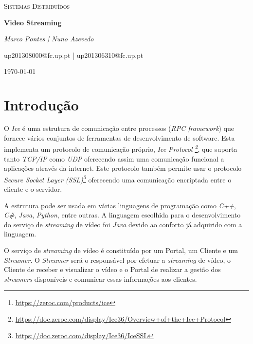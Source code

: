 \documentclass{article}
\begin{document}
\begin{titlepage}
	\centering
	\def\svgwidth{0.6\textwidth}
	\par
	\vspace{1cm}
	{\scshape\Large Sistemas Distribuídos\par}
	\vspace{3cm}
	{\Huge\bfseries Video Streaming\par}
	\vspace{5cm}
	{\Large\itshape Marco Pontes | Nuno Azevedo\par}
	\vspace{0.5cm}
	{\Large up201308000@fc.up.pt | up201306310@fc.up.pt\par}
	\vfill
	{\large \today}
\end{titlepage}

\newpage
\setcounter{page}{2}

\begin{abstract}
O objetivo deste projeto é a implementação de um serviço de \textit{streaming} de vídeo. A comunicação entre os vários 		elementos intervenientes assenta na tecnologia \textit{Ice}\footnote{\url{https://zeroc.com/products/ice}}.
\end{abstract}


\section{Introdução}

O \textit{Ice} é uma estrutura de comunicação entre processos (\textit{RPC framework}) que fornece vários conjuntos de ferramentas de desenvolvimento de software. Esta implementa um protocolo de comunicação próprio, \textit{Ice Protocol \footnote{\url{https://doc.zeroc.com/display/Ice36/Overview+of+the+Ice+Protocol}}}, que suporta tanto \textit{TCP/IP} como \textit{UDP} oferecendo assim uma comunicação funcional a aplicações através da internet. Este protocolo também permite usar o protocolo \textit{Secure Socket Layer (SSL)\footnote{\url{https://doc.zeroc.com/display/Ice36/IceSSL}}} oferecendo uma comunicação encriptada entre o cliente e o servidor. 

A estrutura pode ser usada em várias linguagens de programação como \textit{C++}, \textit{C\#}, \textit{Java}, \textit{Python}, entre outras. A linguagem escolhida para o desenvolvimento do serviço de \textit{streaming} de vídeo foi \textit{Java} devido ao conforto já adquirido com a linguagem.

O serviço de \textit{streaming} de vídeo é constituído por um Portal, um Cliente e um \textit{Streamer}. O \textit{Streamer} será o responsável por efetuar a \textit{streaming} de vídeo, o Cliente de receber e visualizar o vídeo e o Portal de realizar a gestão dos \textit{streamers} disponíveis e comunicar essas informações aos clientes.
\end{document}

